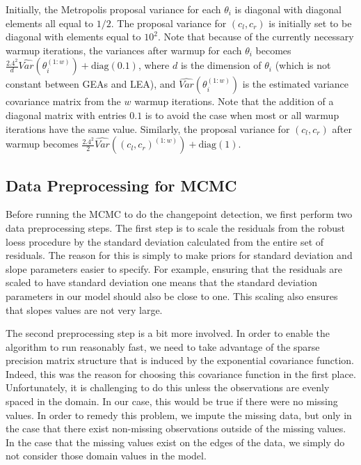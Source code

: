 \documentclass[12pt]{article}
\begin{document}
Initially, the Metropolis proposal variance for each \(\theta_i\) is
diagonal with diagonal elements all equal to \(1/2\). The proposal
variance for \((c_l, c_r)\) is initially set to be diagonal with
elements equal to \(10^2\). Note that because of the currently necessary
warmup iterations, the variances after warmup for each \(\theta_i\)
becomes
\(\frac{2.4^2}{d}\hat{Var}(\theta_i^{(1:w)}) + \text{diag}(0.1)\), where
\(d\) is the dimension of \(\theta_i\) (which is not constant between
GEAs and LEA), and \(\hat{Var}(\theta_i^{(1:w)})\) is the estimated
variance covariance matrix from the \(w\) warmup iterations. Note that
the addition of a diagonal matrix with entries \(0.1\) is to avoid the
case when most or all warmup iterations have the same value. Similarly,
the proposal variance for \((c_l, c_r)\) after warmup becomes
\(\frac{2.4^2}{2}\hat{Var}((c_l,c_r)^{(1:w)}) + \text{diag}(1)\).

\subsection{Data Preprocessing for MCMC}

Before running the MCMC to do the changepoint detection, we first
perform two data preprocessing steps. The first step is to scale the
residuals from the robust loess procedure by the standard deviation
calculated from the entire set of residuals. The reason for this is
simply to make priors for standard deviation and slope parameters easier
to specify. For example, ensuring that the residuals are scaled to have
standard deviation one means that the standard deviation parameters in
our model should also be close to one. This scaling also ensures that
slopes values are not very large.

The second preprocessing step is a bit more involved. In order to enable
the algorithm to run reasonably fast, we need to take advantage of the
sparse precision matrix structure that is induced by the exponential
covariance function. Indeed, this was the reason for choosing this
covariance function in the first place. Unfortunately, it is challenging
to do this unless the observations are evenly spaced in the domain. In
our case, this would be true if there were no missing values. In order
to remedy this problem, we impute the missing data, but only in the case
that there exist non-missing observations outside of the missing values.
In the case that the missing values exist on the edges of the data, we
simply do not consider those domain values in the model.
\end{document}

